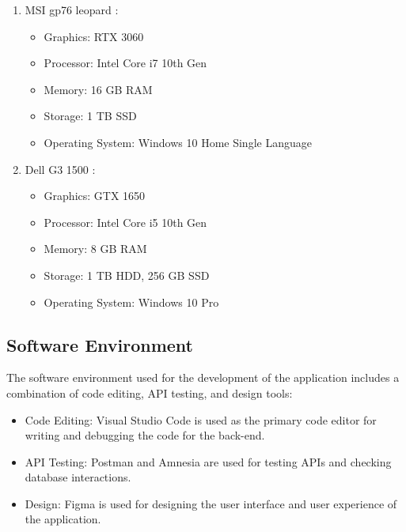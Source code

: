 \begin{enumerate}
    \item MSI gp76 leopard :
          \begin{itemize}
              \item Graphics: RTX 3060
              \item Processor: Intel Core i7 10th Gen
              \item Memory: 16 GB RAM
              \item Storage: 1 TB SSD
              \item Operating System: Windows 10 Home Single Language
          \end{itemize}
    \item Dell G3 1500 :
          \begin{itemize}
              \item Graphics: GTX 1650
              \item  Processor: Intel Core i5 10th Gen
              \item Memory: 8 GB RAM
              \item Storage: 1 TB HDD, 256 GB SSD
              \item Operating System: Windows 10 Pro
          \end{itemize}
\end{enumerate}

\subsection{Software Environment}
The software environment used for the development of the application includes a combination of code editing, API testing, and design tools:

\begin{itemize}
    \renewcommand\labelitemi{-}
    \item Code Editing: Visual Studio Code is used as the primary code editor for writing and debugging the code for the back-end.
    \item API Testing: Postman and Amnesia are used for testing APIs and checking database interactions.
    \item Design: Figma is used for designing the user interface and user experience of the application.
\end{itemize}

